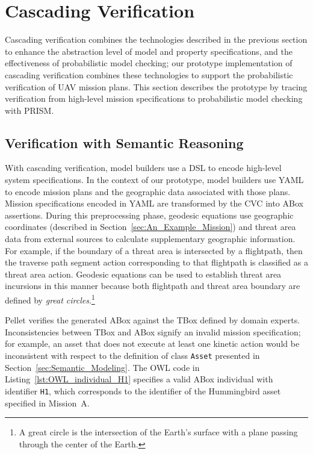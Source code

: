 \section{Cascading Verification}
\label{sec:Cascading_Verification}

\noindent Cascading verification combines the technologies described in the previous section to enhance the abstraction level of model and property specifications, and the effectiveness of probabilistic model checking; our prototype implementation of cascading verification combines these technologies to support the probabilistic verification of UAV mission plans. This section describes the prototype by tracing verification from high-level mission specifications to probabilistic model checking with PRISM\@.

\subsection{Verification with Semantic Reasoning}
\label{sec:Verification_with_Semantic_Reasoning}

\noindent With cascading verification, model builders use a DSL to encode high-level system specifications. In the context of our prototype, model builders use YAML to encode mission plans and the geographic data associated with those plans. Mission specifications encoded in YAML are transformed by the CVC into ABox assertions. During this preprocessing phase, geodesic equations use geographic coordinates (described in Section~\ref{sec:An_Example_Mission}) and threat area data from external sources to calculate supplementary geographic information. For example, if the boundary of a threat area is intersected by a flightpath, then the traverse path segment action corresponding to that flightpath is classified as a threat area action. Geodesic equations can be used to establish threat area incursions in this manner because both flightpath and threat area boundary are defined by \emph{great circles}.\footnote{A great circle is the intersection of the Earth's surface with a plane passing through the center of the Earth.}

Pellet verifies the generated ABox against the TBox defined by domain experts. Inconsistencies between TBox and ABox signify an invalid mission specification; for example, an asset that does not execute at least one kinetic action would be inconsistent with respect to the definition of class \texttt{Asset} presented in Section~\ref{sec:Semantic_Modeling}. The OWL code in Listing~\ref{lst:OWL_individual_H1} specifies a valid ABox individual with identifier \texttt{H1}, which corresponds to the identifier of the Hummingbird asset specified in Mission~A.

